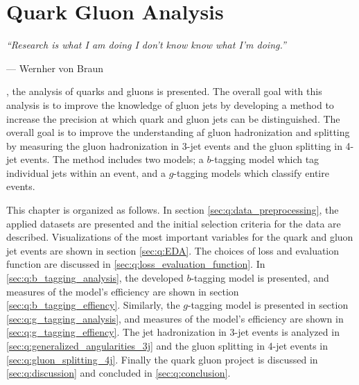 
\chapter{Quark Gluon Analysis}
\label{ch:quark_gluon_analysis}
\epigraph{\textit{``Research is what I am doing I don't know know what I'm doing.''}}{---  Wernher von Braun}

, the analysis of quarks and gluons is presented. The overall goal with this analysis is to improve the knowledge of gluon jets by developing a method to increase the precision at which quark and gluon jets can be distinguished. The overall goal is to improve the understanding af gluon hadronization and splitting by measuring the gluon hadronization in 3-jet events and the gluon splitting in 4-jet events.
The method includes two models; a $b$-tagging model which tag individual jets within an event, and a $g$-tagging models which classify entire events. 


This chapter is organized as follows. In section \autoref{sec:q:data_preprocessing}, the applied datasets are presented and the initial selection criteria for the data are described. Visualizations of the most important variables for the quark and gluon jet events are shown in section \autoref{sec:q:EDA}. The choices of loss and evaluation function are discussed in \autoref{sec:q:loss_evaluation_function}. In \autoref{sec:q:b_tagging_analysis}, the developed $b$-tagging model is presented, and measures of the model's efficiency are shown in section \autoref{sec:q:b_tagging_effiency}. Similarly, the $g$-tagging model is presented in section \autoref{sec:q:g_tagging_analysis}, and measures of the model's efficiency are shown in \autoref{sec:q:g_tagging_effiency}. The jet hadronization in 3-jet events is analyzed in \autoref{sec:q:generalized_angularities_3j} and the gluon splitting in 4-jet events in \autoref{sec:q:gluon_splitting_4j}. Finally the quark gluon project is discussed in \autoref{sec:q:discussion} and concluded in \autoref{sec:q:conclusion}.


